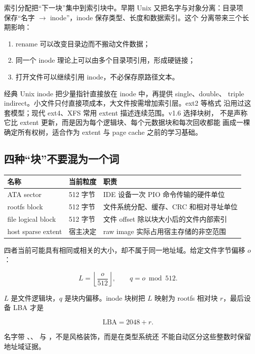 索引分配把“下一块”集中到索引块中。早期 Unix 又把名字与对象分离：目录项
保存“名字 \(\rightarrow\) inode”，inode 保存类型、长度和数据索引。这个
分离带来三个长期影响：

\begin{enumerate}
  \item rename 可以改变目录边而不搬动文件数据；
  \item 同一个 inode 理论上可以由多个目录项引用，形成硬链接；
  \item 打开文件可以继续引用 inode，不必保存原路径文本。
\end{enumerate}

经典 Unix inode 把少量指针直接放在 inode 中，再提供 single、double、
triple indirect。小文件只付直接项成本，大文件按需增加索引层。ext2 等格式
沿用过这套模型；现代 ext4、XFS 常用 extent 描述连续范围。v1.6 选择块树，
不是声称它比 extent 更新，而是因为每个逻辑块、每个元数据块和每次回收都能
画成一棵确定所有权树，适合作为 extent 与 page cache 之前的学习基础。

\subsection{四种“块”不要混为一个词}

\begin{longtable}{L{0.22\textwidth}L{0.24\textwidth}L{0.43\textwidth}}
\toprule
名称 & 当前粒度 & 职责\\
\midrule
ATA sector & 512 字节 & IDE 设备一次 PIO 命令传输的硬件单位\\
rootfs block & 512 字节 & 文件系统分配、缓存、CRC 和相对寻址单位\\
file logical block & 512 字节 & 文件 offset 除以块大小后的文件内部索引\\
host sparse extent & 宿主决定 & raw image 实际占用宿主存储的非空范围\\
\bottomrule
\end{longtable}

四者当前可能具有相同或相关的大小，却不属于同一地址域。给定文件字节偏移
\(o\)：

\[
  L=\left\lfloor\frac{o}{512}\right\rfloor,\qquad
  q=o\bmod512.
\]

\(L\) 是文件逻辑块，\(q\) 是块内偏移。inode 块树把 \(L\) 映射为
rootfs 相对块 \(r\)，最后设备 LBA 才是

\[
  \mathrm{LBA}=2048+r.
\]

名字带 、、
 与 ，不是风格装饰，而是在类型系统还
不能自动区分这些整数时保留地址域证据。

